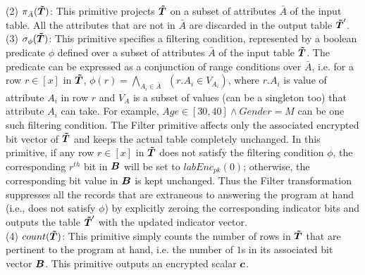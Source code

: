     (2) $\pi_{\bar{A}}(\boldsymbol{\tilde{T}})$: This primitive projects $\boldsymbol{\tilde{T}}$ on  a subset of attributes $\bar{A}$ of the input table. All the attributes that are not in $\bar{A}$ are discarded in the output table $\boldsymbol{\tilde{T}}'$.\\
	(3) $\sigma_{\phi}(\boldsymbol{\tilde{T}})$: This primitive specifies a filtering condition, represented by a boolean predicate $\phi$ defined over a subset of attributes $\bar{A}$ of the input table $\boldsymbol{\tilde{T}}$. The predicate can be expressed as a conjunction of range conditions over $\bar{A}$, i.e. for a row $r \in [x]$ in $\boldsymbol{\tilde{T}}$, $\phi(r) = \bigwedge_{A_i \in \bar{A}} ~~(r.{A_i} \in V_{A_i})$,  where $r.A_i$ is value of attribute $A_i$ in row $r$ and $V_A$ is a subset of values (can be a singleton too) that attribute $A_i$ can take.  For example, $Age\in [30,40]\wedge Gender=M$ can be one such  filtering condition. The \textsf{Filter} primitive affects only the associated encrypted bit vector of $\boldsymbol{\tilde{T}}$ and keeps the actual table completely unchanged.  In this primitive, if any row $r \in [x]$ in $\boldsymbol{\tilde{T}}$ does not satisfy the filtering condition $\phi$, the corresponding $r^{th}$ bit in $\boldsymbol{B}$ will be set to $labEnc_{pk}(0)$; otherwise, the corresponding bit value in $\boldsymbol{B}$ is kept unchanged. 
Thus the \textsf{Filter} transformation suppresses all the records that are extraneous to answering the program at hand (i.e., does not satisfy $\phi$) by explicitly zeroing the corresponding indicator bits and outputs the table $\boldsymbol{\tilde{T}}'$ with the updated indicator vector.\\
(4) $count(\boldsymbol{\tilde{T}})$: This primitive simply counts the number of rows in $\boldsymbol{\tilde{T}}$ that are pertinent to the program at hand, i.e. the number of $1$s in its associated bit vector $\boldsymbol{B}$.  This primitive outputs an encrypted scalar $\boldsymbol{c}$. \\%
